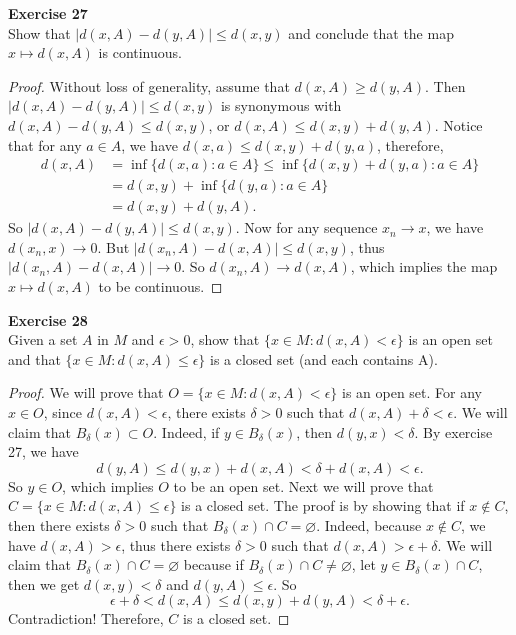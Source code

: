 \documentclass[12pt, a4paper]{article}
\theoremstyle{plain}
\newenvironment{exercise}[2][Exercise]
    { \begin{mdframed}[backgroundcolor=gray!20] \textbf{#1 #2} \\}
    {  \end{mdframed}}
\begin{document}
\begin{exercise}{27}
Show that $|d(x,A)-d(y,A)|\leq d(x,y)$ and conclude that the map $x\mapsto d(x,A)$ is continuous.
\end{exercise}
    \begin{proof}
    Without loss of generality, assume that $d(x,A)\geq d(y,A)$. Then $|d(x,A)-d(y,A)|\leq d(x,y)$ is synonymous with $d(x,A)-d(y,A)\leq d(x,y)$, or $d(x,A)\leq d(x,y)+d(y,A)$. Notice that for any $a\in A$, we have $d(x,a)\leq d(x,y)+d(y,a)$, therefore,
    \begin{align*}
    d(x,A)&=\inf\{d(x,a):a\in A\}\leq \inf\{d(x,y)+d(y,a):a\in A\}\\
    &=d(x,y)+\inf\{d(y,a):a\in A\}\\
    &=d(x,y)+d(y,A).
    \end{align*}
    So $|d(x,A)-d(y,A)|\leq d(x,y)$. Now for any sequence $x_n\rightarrow x$, we have $d(x_n,x)\rightarrow 0$. But $|d(x_n,A)-d(x,A)|\leq d(x,y)$, thus $|d(x_n,A)-d(x,A)|\rightarrow 0$. So $d(x_n,A)\rightarrow d(x,A)$, which implies the map $x\mapsto d(x,A)$ to be continuous.
    \end{proof}

\pagebreak

\begin{exercise}{28}
Given a set $A$ in $M$ and $\epsilon>0$, show that $\{x\in M:d(x,A)<\epsilon\}$ is an open set and that $\{x\in M: d(x,A)\leq \epsilon\}$ is a closed set (and each contains A).
\end{exercise}
    \begin{proof}
    We will prove that $O=\{x\in M:d(x,A)<\epsilon\}$ is an open set. For any $x\in O$, since $d(x,A)<\epsilon$, there exists $\delta >0$ such that $d(x,A)+\delta<\epsilon$. We will claim that $B_\delta(x)\subset O$. Indeed, if $y\in B_\delta(x)$, then $d(y,x)<\delta$. By exercise 27, we have
    \[
    d(y,A)\leq d(y,x)+d(x,A)<\delta +d(x,A)<\epsilon.
    \]
    So $y\in O$, which implies $O$ to be an open set. Next we will prove that $C=\{x\in M:d(x,A)\leq \epsilon\}$ is a closed set. The proof is by showing that if $x\notin C$, then there exists $\delta >0$ such that $B_\delta(x)\cap C=\varnothing$. Indeed, because $x\notin C$, we have $d(x,A)>\epsilon$, thus there exists $\delta>0$ such that $d(x,A)>\epsilon+\delta$. We will claim that $B_\delta(x)\cap C=\varnothing$ because if $B_\delta(x)\cap C\neq\varnothing$, let $y\in B_\delta(x)\cap C$, then we get $d(x,y)<\delta$ and $d(y,A)\leq \epsilon$. So
    \[
    \epsilon+\delta <d(x,A)\leq d(x,y)+d(y,A)<\delta +\epsilon.
    \]
    Contradiction! Therefore, $C$ is a closed set.
    \end{proof}
\end{document}
